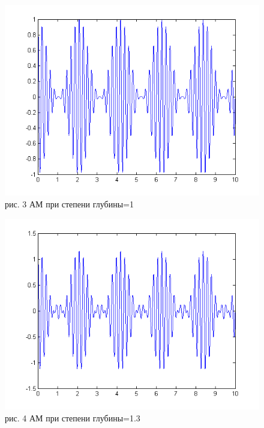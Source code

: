 \documentclass[10pt,a4paper]{report}
\begin{document}
\begin{figure}
\begin{center}
\includegraphics[angle=0, scale = 0.8]{1_4.png}\newline
рис. 3  АМ при степени глубины=1\newline
\end{center}
\end{figure}
\begin{figure}
\begin{center}
\includegraphics[angle=0, scale = 0.8]{1_6.png}\newline
рис. 4  АМ при степени глубины=1.3\newline
\end{center}
\end{figure}
\end{document}

